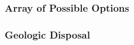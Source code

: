 
\begin{frame}
    \frametitle{Array of Possible Options}
    
  \end{frame}

\begin{frame}
    \frametitle{Geologic Disposal}
    
  \end{frame} 
